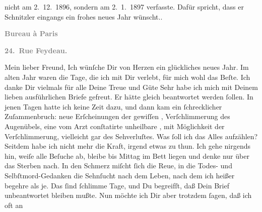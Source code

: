 \begin{ledgroupsized}[t]{13cm}
{{{                        nicht am 2. 12. 1896, sondern am 2. 1. 1897 verfasste. Dafür spricht, dass er Schnitzler eingangs ein frohes neues
                           Jahr wünscht.}}}\label{K_L02792-48h}.\pend
           \pstart
           \begin{otherlanguage}{french}\textcolor{gray}{\textbf{\textbf{Bureau à Paris}}}\end{otherlanguage}\pend
           \pstart
           \begin{otherlanguage}{french}\textcolor{gray}{\textbf{\textbf{24. Rue Feydeau.}}}\end{otherlanguage}\pend
           \pstart{}Mein lieber Freund,\pend\pstart
           Ich wünſche Dir von Herzen ein glückliches neues Jahr. Im
               alten Jahr waren die Tage, die ich mit Dir verlebt, für mich
               wohl das Beſte. Ich danke Dir \strikeout{\textcolor{gray}{×}\-\textcolor{gray}{×}\-\textcolor{gray}{×}} vielmals für alle Deine Treue und Güte{\dotsseven}\pend
           \pstart
           Sehr habe ich mich mit Deinem lieben ausführlichen Briefe gefreut. Er hätte gleich
               beantwortet werden ſollen. In jenen Tagen hatte ich keine Zeit dazu, und dann kam ein
               ſchrecklicher  Zuſammenbruch: neue Erſcheinungen der gewiſſen \label{K_L02792-1v}\label{K_L02792-1h}, Verſchlimmerung des Augenübels, eine vom Arzt
               conſtatirte unheilbare \label{K_L02792-2v}\label{K_L02792-2h}, {\pb}mit Möglichkeit der Verſchlimmerung, vielleicht gar
               des Sehverluſtes. Was ſoll ich das Alles aufzählen? Seitdem habe ich nicht mehr die
               Kraft, irgend etwas zu thun. Ich gehe nirgends hin, weiſe alle Beſuche ab, bleibe bis
                  Mittag im Bett liegen und denke nur über das Sterben nach. In den
               Schmerz miſcht ſich die Reue, in die Todes- und Selbſtmord-Gedanken die Sehnſucht
               nach dem Leben, nach dem ich heißer begehre als je. Das ſind ſchlimme Tage, und Du
               begreifſt, daß  Dein Brief
               unbeantwortet bleiben mußte. Nun möchte ich Dir aber trotzdem ſagen, daß ich oft an

\end{ledgroupsized}
